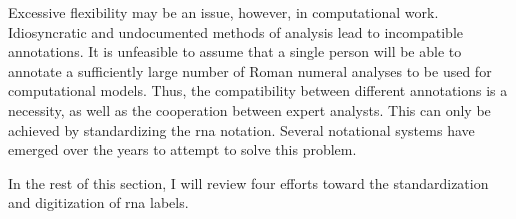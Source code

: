 Excessive flexibility may be an issue, however, in
computational work. Idiosyncratic and undocumented methods
of analysis lead to incompatible annotations. It is
unfeasible to assume that a single person will be able to
annotate a sufficiently large number of Roman numeral
analyses to be used for computational models. Thus, the
compatibility between different annotations is a necessity,
as well as the cooperation between expert analysts. This can
only be achieved by standardizing the \gls{rna} notation.
Several notational systems have emerged over the years to
attempt to solve this problem.

In the rest of this section, I will review four efforts
toward the standardization and digitization of \gls{rna}
labels.

